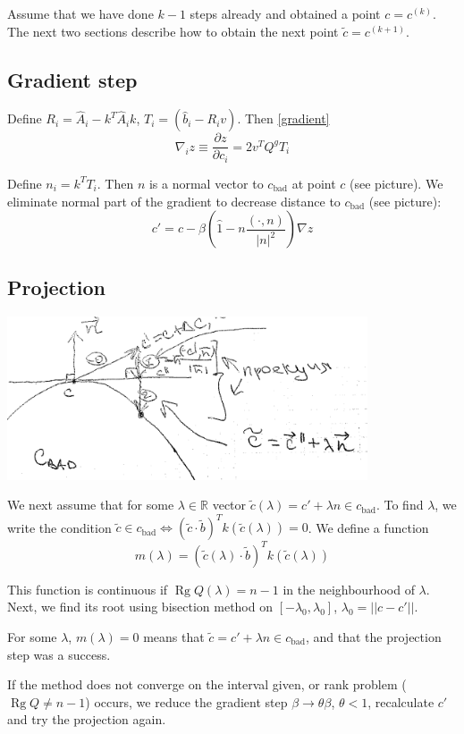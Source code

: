 \documentclass[a4paper]{article}
\DeclareMathOperator{\Rg}{Rg}
\newcommand{\cbad}{c_{\mathrm{bad}}}
\begin{document}
Assume that we have done $k-1$ steps already and obtained a point $c=c^{(k)}$. The next two sections describe how to obtain the next point $\tilde{c}=c^{(k+1)}$.

\subsection{Gradient step}
Define $R_i=\hat{A}_i-k^T\hat{A}_ik$, $T_i=(\hat{b}_i-R_iv)$. Then \ref{gradient}
$$\nabla_iz\equiv \frac{\partial z}{\partial c_i}=2v^TQ^gT_i$$

Define $n_i=k^TT_i$. Then $n$ is a normal vector to $\cbad$ at point $c$ (see picture). We eliminate normal part of the gradient to decrease distance to $\cbad$ (see picture):
$$c'=c-\beta\left(\hat{1}-n\frac{(\cdot, n)}{|n|^2}\right)\nabla z$$

\subsection{Projection}
\includegraphics[width=0.8\textwidth]{c_bad_continuum.png}

We next assume that for some $\lambda\in\mathbb{R}$ vector $\tilde{c}(\lambda)=c'+\lambda n\in\cbad$. To find $\lambda$, we write the condition $\tilde{c}\in\cbad\Leftrightarrow (\tilde{c}\cdot \tilde{b})^T k(\tilde{c}(\lambda))=0$. We define a function
$$m(\lambda)=(\tilde{c}(\lambda)\cdot \tilde{b})^T k(\tilde{c}(\lambda))$$

This function is continuous if $\Rg Q(\lambda)=n-1$ in the neighbourhood of $\lambda$. Next, we find its root using bisection method on $[-\lambda_0,\lambda_0]$, $\lambda_0=||c-c'||$.

For some $\lambda$, $m(\lambda)=0$ means that $\tilde{c}=c'+\lambda n\in\cbad$, and that the projection step was a success.

If the method does not converge on the interval given, or rank problem ($\Rg Q\neq n-1$) occurs, we reduce the gradient step $\beta\to \theta\beta$, $\theta <1$, recalculate $c'$ and try the projection again.
\end{document}
